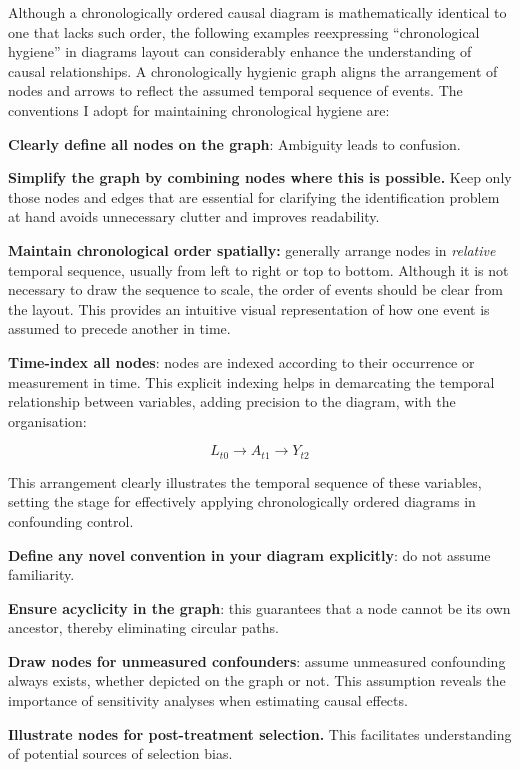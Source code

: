 \documentclass[
  singlecolumn,
  9pt]{article}
\begin{document}
Although a chronologically ordered causal diagram is mathematically
identical to one that lacks such order, the following examples
reexpressing ``chronological hygiene'' in diagrams layout can
considerably enhance the understanding of causal relationships. A
chronologically hygienic graph aligns the arrangement of nodes and
arrows to reflect the assumed temporal sequence of events. The
conventions I adopt for maintaining chronological hygiene are:

\textbf{Clearly define all nodes on the graph}: Ambiguity leads to
confusion.

\textbf{Simplify the graph by combining nodes where this is possible.}
Keep only those nodes and edges that are essential for clarifying the
identification problem at hand avoids unnecessary clutter and improves
readability.

\textbf{Maintain chronological order spatially:} generally arrange nodes
in \emph{relative} temporal sequence, usually from left to right or top
to bottom. Although it is not necessary to draw the sequence to scale,
the order of events should be clear from the layout. This provides an
intuitive visual representation of how one event is assumed to precede
another in time.

\textbf{Time-index all nodes}: nodes are indexed according to their
occurrence or measurement in time. This explicit indexing helps in
demarcating the temporal relationship between variables, adding
precision to the diagram, with the organisation:

\[L_{t0} \to A_{t1} \to Y_{t2}\]

This arrangement clearly illustrates the temporal sequence of these
variables, setting the stage for effectively applying chronologically
ordered diagrams in confounding control.

\textbf{Define any novel convention in your diagram explicitly}: do not
assume familiarity.

\textbf{Ensure acyclicity in the graph}: this guarantees that a node
cannot be its own ancestor, thereby eliminating circular paths.

\textbf{Draw nodes for unmeasured confounders}: assume unmeasured
confounding always exists, whether depicted on the graph or not. This
assumption reveals the importance of sensitivity analyses when
estimating causal effects.

\textbf{Illustrate nodes for post-treatment selection.} This facilitates
understanding of potential sources of selection bias.
\end{document}
